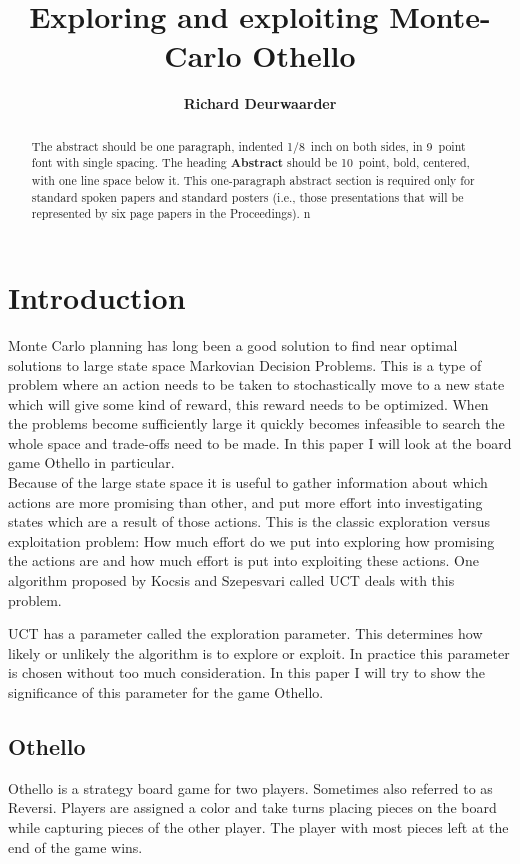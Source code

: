 \documentclass[10pt,letterpaper]{article}
\title{Exploring and exploiting Monte-Carlo Othello}
\author{\large \bf Richard Deurwaarder}
\begin{document}
\maketitle

\begin{abstract}
The abstract should be one paragraph, indented 1/8~inch on both sides,
in 9~point font with single spacing. The heading {\bf Abstract} should
be 10~point, bold, centered, with one line space below it. This
one-paragraph abstract section is required only for standard spoken
papers and standard posters (i.e., those presentations that will be
represented by six page papers in the Proceedings).
n
\end{abstract}

\section{Introduction}
Monte Carlo planning has long been a good solution to find near optimal solutions to large state space Markovian Decision Problems. This is a type of problem where an action needs to be taken to stochastically move to a new state which will give some kind of reward, this reward needs to be optimized. When the problems become sufficiently large it quickly becomes infeasible to search the whole space and trade-offs need to be made. In this paper I will look at the board game Othello in particular.\\

Because of the large state space it is useful to gather information about which actions are more promising than other, and put more effort into investigating states which are a result of those actions. This is the classic exploration versus exploitation problem: How much effort do we put into exploring how promising the actions are and how much effort is put into exploiting these actions. One algorithm proposed by Kocsis and Szepesvari\cite{Kocsis:2006} called UCT deals with this problem.

UCT has a parameter called the exploration parameter. This determines how likely or unlikely the algorithm is to explore or exploit. In practice this parameter is chosen without too much consideration. In this paper I will try to show the significance of this parameter for the game Othello.

\subsection{Othello}
Othello is a strategy board game for two players. Sometimes also referred to as Reversi. Players are assigned a color and take turns placing pieces on the board while capturing pieces of the other player. The player with most pieces left at the end of the game wins. 
\end{document}
